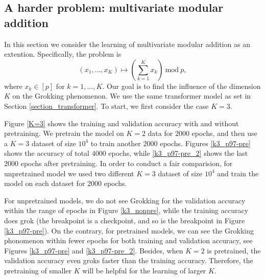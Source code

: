 \documentclass[UTF8]{article}
\begin{document}
\subsection{A harder problem: multivariate modular addition}
In this section we consider the learning of multivariate modular addition as an extention. Specifically, the problem is
\begin{equation*}
  (x_1,\ldots,x_K) \mapsto \left(\sum_{k=1}^K x_k \right)~ \mathrm{mod} ~ p, 
\end{equation*}
where $x_k \in [p]$ for $k=1,\ldots,K$. Our goal is to find the influence of the
dimension $K$ on the Grokking phenomenon. We use the same transformer model as
set in Section \ref{section_transformer}. To start, we first consider the case $K=3$.

Figure \ref{K=3} shows the training and validation accuracy with and without
pretraining. We pretrain the model on $K=2$ data for $2000$ epochs,
and then use a $K=3$ dataset of size $10^4$ to train another $2000$ epochs.
Figures \ref{k3_p97-pre} shows the accuracy of total $4000$ epochs,
while \ref{k3_p97-pre_2} shows the last $2000$ epochs after pretraining.
In order to conduct a fair comparision, for unpretrained model we used
two different $K=3$ dataset of size $10^4$ and train the model on each dataset
for $2000$ epochs.

For unpretrained models, we do not see Grokking for the validation
accuracy within the range of epochs in Figure \ref{k3_nonpre}, while the
training accuracy does grok (the breakpoint is a checkpoint, and so is the
breakpoint in Figure \ref{k3_p97-pre}). On the contrary, for pretrained models,
we can see the Grokking phonomenon within fewer epochs for both training and
validation accuracy, see Figures \ref{k3_p97-pre} and
\ref{k3_p97-pre_2}. Besides, when $K=2$ is
pretrained, the validation accuracy even groks faster than the training
accuracy. Therefore, the pretraining of smaller $K$ will be helpful for the
learning of larger $K$.
\end{document}
